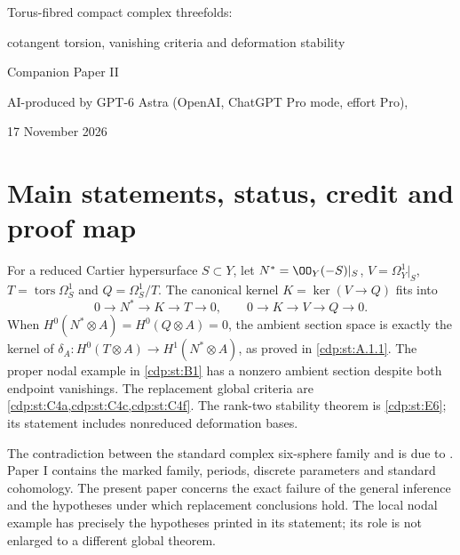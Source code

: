 \begin{center}
{\LARGE Torus-fibred compact complex threefolds:\par
cotangent torsion, vanishing criteria and deformation stability}\par\medskip
{\large Companion Paper II}\par\medskip
AI-produced by GPT-6 Astra (OpenAI, ChatGPT Pro mode, effort Pro),\par
17 November 2026
\end{center}
\begin{abstract}
We identify the torsion term omitted in the singular-fibre endpoint argument
of Campana, Demailly and Peternell and prove the exact connecting-map
criterion that replaces that inference. Proper nodal and compact examples
show why the endpoint vanishings alone do not suffice. We determine the
inverse-Jacobian and conductor maps, retain multiplicities in fibre
cohomology, and construct compact torus fibrations with the specified
normalization and component classes. Integral specialization and coherent
restriction calculations give the correct component counts and Picard
conditions. We prove stability of rank-two torus fibrations, compute the
deformations of the comb and two-parameter families, and distinguish the
remaining bundle-splitting question from the established deformation results.
\end{abstract}

\section*{Main statements, status, credit and proof map}
For a reduced Cartier hypersurface $S\subset Y$, let
$N^*=\OO_Y(-S)|_S$, $V=\Omega_Y^1|_S$,
$T=\operatorname{tors}\Omega_S^1$ and $Q=\Omega_S^1/T$.
The canonical kernel $K=\ker(V\to Q)$ fits into
\[
0\longrightarrow N^*\longrightarrow K\longrightarrow T\longrightarrow0,
\qquad
0\longrightarrow K\longrightarrow V\longrightarrow Q\longrightarrow0.
\]
When $H^0(N^*\otimes A)=H^0(Q\otimes A)=0$, the ambient section
space is exactly the kernel of
$\delta_A:H^0(T\otimes A)\to H^1(N^*\otimes A)$,
as proved in \cref{cdp:st:A.1.1}.
The proper nodal example in \cref{cdp:st:B1} has a nonzero ambient
section despite both endpoint vanishings.
The replacement global criteria are \cref{cdp:st:C4a,cdp:st:C4c,cdp:st:C4f}.
The rank-two stability theorem is \cref{cdp:st:E6}; its statement includes
nonreduced deformation bases.

The contradiction between the standard complex six-sphere family and
\citet[Corollary~2.3]{CDP20} is due to
\citet[Section~1.2 and Theorem~10.5]{AC2026}.
Paper I contains the marked family, periods, discrete parameters and
standard cohomology. The present paper concerns the exact failure of the
general inference and the hypotheses under which replacement conclusions
hold. The local nodal example has precisely the hypotheses printed in its
statement; its role is not enlarged to a different global theorem.

